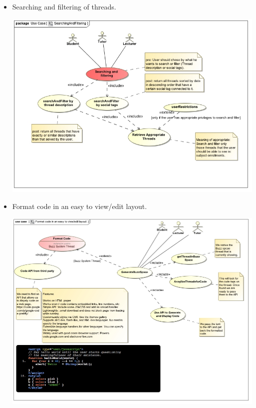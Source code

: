 \documentclass[a4paper,12pt]{report}
\begin{document}
\begin{itemize}
\begin{center}
	\end{center}
  \item Searching and filtering of threads.
	\begin{center}
  	\includegraphics[width=1\textwidth]{../Functional_Requirements_DIagrams/UseCases/UseCase_SearchingAndFiltering.jpg}\\[0.4cm]    
	\end{center}
  \item Format code in an easy to view/edit layout.
	\begin{center}
  	\includegraphics[width=1\textwidth]		{../Functional_Requirements_DIagrams/UseCases/UseCase_FormatCode.jpg}\\[0.4cm]    
	\end{center}
\end{itemize}
\end{document}
